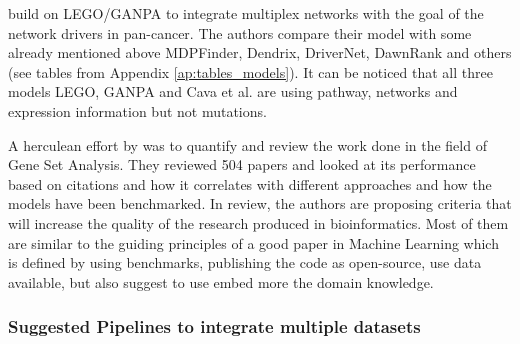 \citet{Cava2018-rv} build on LEGO/GANPA to integrate multiplex networks with the goal of the network drivers in pan-cancer. The authors compare their model with some already mentioned above MDPFinder\cite{Zhao2012-wj}, Dendrix\cite{Vandin2012-cf}, DriverNet\cite{Bashashati2012-lk}, DawnRank\cite{Hou2014-se} and others (see tables from Appendix \ref{ap:tables_models}). It can be noticed that all three models LEGO, GANPA and Cava et al. are using pathway, networks and expression information but not mutations.



A herculean effort by \citet{Xie2021-al} was to quantify and review the work done in the field of Gene Set Analysis. They reviewed 504 papers and looked at its performance based on citations and how it correlates with different approaches and how the models have been benchmarked. In review, the authors are proposing criteria that will increase the quality of the research produced in bioinformatics. Most of them are similar to the guiding principles of a good paper in Machine Learning which is defined by using benchmarks, publishing the code as open-source, use data available, but also suggest to use embed more the domain knowledge.


\subsubsection*{Suggested Pipelines to integrate multiple datasets} \label{s:pipelines}


